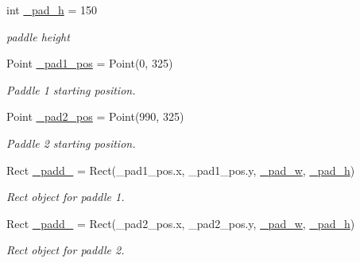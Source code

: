 \begin{DoxyCompactItemize}
\hypertarget{class_c_pong_a1008f27cb4af2fae05ab2fa5fef19d6d}{}\label{class_c_pong_a1008f27cb4af2fae05ab2fa5fef19d6d} 
int \hyperlink{class_c_pong_a1008f27cb4af2fae05ab2fa5fef19d6d}{\+\_\+pad\+\_\+h} = 150
\begin{DoxyCompactList}\small\item\em paddle height \end{DoxyCompactList}\item 
\hypertarget{class_c_pong_abd0dbd6e750836b6dafa947709e07bff}{}\label{class_c_pong_abd0dbd6e750836b6dafa947709e07bff} 
Point \hyperlink{class_c_pong_abd0dbd6e750836b6dafa947709e07bff}{\+\_\+pad1\+\_\+pos} = Point(0, 325)
\begin{DoxyCompactList}\small\item\em Paddle 1 starting position. \end{DoxyCompactList}\item 
\hypertarget{class_c_pong_ac91793b7662e0d0119a287da22890f14}{}\label{class_c_pong_ac91793b7662e0d0119a287da22890f14} 
Point \hyperlink{class_c_pong_ac91793b7662e0d0119a287da22890f14}{\+\_\+pad2\+\_\+pos} = Point(990, 325)
\begin{DoxyCompactList}\small\item\em Paddle 2 starting position. \end{DoxyCompactList}\item 
\hypertarget{class_c_pong_ad2af2b947a812716e48312358c15a55b}{}\label{class_c_pong_ad2af2b947a812716e48312358c15a55b} 
Rect \hyperlink{class_c_pong_ad2af2b947a812716e48312358c15a55b}{\+\_\+padd\+\_} = Rect(\+\_\+pad1\+\_\+pos.\+x, \+\_\+pad1\+\_\+pos.\+y, \hyperlink{class_c_pong_a4e5f5d5c1cca75edd23b0fffe937a13f}{\+\_\+pad\+\_\+w}, \hyperlink{class_c_pong_a1008f27cb4af2fae05ab2fa5fef19d6d}{\+\_\+pad\+\_\+h})
\begin{DoxyCompactList}\small\item\em Rect object for paddle 1. \end{DoxyCompactList}\item 
\hypertarget{class_c_pong_ae23f4be0ba82d03c3420e248038e7d9a}{}\label{class_c_pong_ae23f4be0ba82d03c3420e248038e7d9a} 
Rect \hyperlink{class_c_pong_ae23f4be0ba82d03c3420e248038e7d9a}{\+\_\+padd\+\_} = Rect(\+\_\+pad2\+\_\+pos.\+x, \+\_\+pad2\+\_\+pos.\+y, \hyperlink{class_c_pong_a4e5f5d5c1cca75edd23b0fffe937a13f}{\+\_\+pad\+\_\+w}, \hyperlink{class_c_pong_a1008f27cb4af2fae05ab2fa5fef19d6d}{\+\_\+pad\+\_\+h})
\begin{DoxyCompactList}\small\item\em Rect object for paddle 2. \end{DoxyCompactList}\item 

\end{DoxyCompactItemize}
